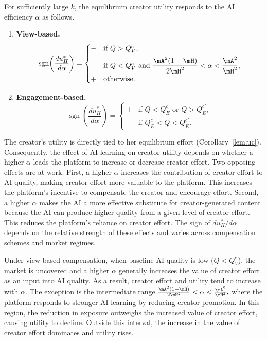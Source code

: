 \begin{corollary}\label{cor:alpha_uh}
For sufficiently
large $k$, the equilibrium creator utility responds to the AI efficiency
$\alpha$ as follows.
\begin{enumerate}
    \item \textbf{View-based.}
    \[
    \operatorname{sgn}\!\left(\frac{du_H^*}{d\alpha}\right)=
    \begin{cases}
    - & \text{if } Q > Q^c_V, \\[4pt]
    - & \text{if } Q < Q^c_V \text{ and } \dfrac{\mA^2(1-\mH)}{2\mH^2} < \alpha < \dfrac{\mA^2}{\mH^2}, \\[4pt]
    + & \text{otherwise.}
    \end{cases}
    \]
    \item \textbf{Engagement-based.}
    \[
    \operatorname{sgn}\!\left(\frac{du_H^*}{d\alpha}\right)=
    \begin{cases}
    + & \text{if }Q < Q^c_E \text{ or } Q > Q^{c'}_E, \\[4pt]
    - & \text{if } Q^c_E < Q < Q^{c'}_E.
    \end{cases}
    \]
\end{enumerate}
\end{corollary}

The creator's utility is directly tied to her equilibrium effort (Corollary~\ref{lem:uc}). Consequently, the effect of AI learning on creator utility depends on whether a higher $\alpha$ leads the platform to increase or decrease creator effort. Two opposing effects are at work. First, a higher $\alpha$ increases the contribution of creator effort to AI quality, making creator effort more valuable to the platform. This increases the platform's incentive to compensate the creator and encourage effort. Second, a higher $\alpha$ makes the AI a more effective substitute for creator-generated content because the AI can produce higher quality from a given level of creator effort. This reduces the platform's reliance on creator effort. The sign of $du_H^*/d\alpha$ depends on the relative strength of these effects and varies across compensation schemes and market regimes.

Under view-based compensation, when baseline AI quality is low ($Q<Q_V^c$), the market is uncovered and a higher $\alpha$ generally increases the value of creator effort as an input into AI quality. As a result, creator effort and utility tend to increase with $\alpha$. The exception is the intermediate range
$
\frac{\mA^2(1-\mH)}{2\mH^2}
<
\alpha
<
\frac{\mA^2}{\mH^2},
$
where the platform responds to stronger AI learning by reducing creator promotion. In this region, the reduction in exposure outweighs the increased value of creator effort, causing utility to decline. Outside this interval, the increase in the value of creator effort dominates and utility rises.

